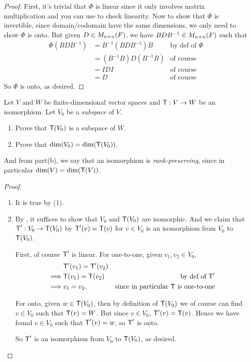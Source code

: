 \begin{proof}
First, it's trivial that \(\Phi\) is linear since it only involves matrix multiplication and you can use  to check linearity.
Now to show that \(\Phi\) is invertible, since domain/codomain have the same dimensions, we only need to show \(\Phi\) is onto.
But given \(D \in M_{n \times n}(F)\), we have \(B D B^{-1} \in M_{n \times n}(F)\) such that
\begin{align*}
    \Phi(B D B^{-1}) & = B^{-1} (B D B^{-1}) B & \text{by def of \(\Phi\)} \\
                     & = (B^{-1}B) D (B^{-1} B) & \text{of course} \\
                     & = IDI & \text{of course} \\
                     & = D & \text{of course}
\end{align*}
So \(\Phi\) is onto, as desired.
\end{proof}

\begin{exercise} \label{exercise 2.4.17}
Let \(V\) and \(W\) be finite-dimensional vector spaces and \(\textsf{T} : V \to W\) be an isomorphism.
Let \(V_0\) be a \emph{subspace} of \(V\).
\begin{enumerate}
\item Prove that \(\textsf{T}(V_0)\) is a subspace of \(W\).
\item Prove that \(\dim(V_0) = \dim(\textsf{T}(V_0))\).
\end{enumerate}
And from part(b), we say that an isomorphism is \emph{rank-preserving}, since in particular \(\dim(V) = \dim(\textsf{T}(V))\).
\end{exercise}

\begin{proof} \ 

\begin{enumerate}
\item It is true by (1).
\item By , it suffices to show that \(V_0\) and \(\textsf{T}(V_0)\) are isomorphic.
And we claim that \(\textsf{T}' : V_0 \to \textsf{T}(V_0)\) by \(\textsf{T}'(v) = \textsf{T}(v)\) for \(v \in V_0\) is an isomorphism from \(V_0\) to \(\textsf{T}(V_0)\).

First, of course \(\textsf{T}'\) is linear.
For one-to-one, given \(v_1, v_2 \in V_0\),
\begin{align*}
             & \textsf{T}'(v_1) = \textsf{T}'(v_2) \\
    \implies & \textsf{T}(v_1) = \textsf{T}(v_2) & \text{by def of \(\textsf{T}'\)} \\
    \implies & v_1 = v_2. & \text{since in particular \(\textsf{T}\) is one-to-one}
\end{align*}

For onto, given \(w \in \textsf{T}(V_0)\), then by definition of \(\textsf{T}(V_0)\) we of course can find \(v \in V_0\) such that \(\textsf{T}(v) = W\).
But since \(v \in V_0\), \(\textsf{T}'(v) = \textsf{T}(v)\).
Hence we have found \(v \in V_0\) such that \(\textsf{T}'(v) = w\), so \(\textsf{T}'\) is onto.

So \(\textsf{T}'\) is an isomorphism from \(V_0\) to \(\textsf{T}(V_0)\), as desired.
\end{enumerate}

\end{proof}

